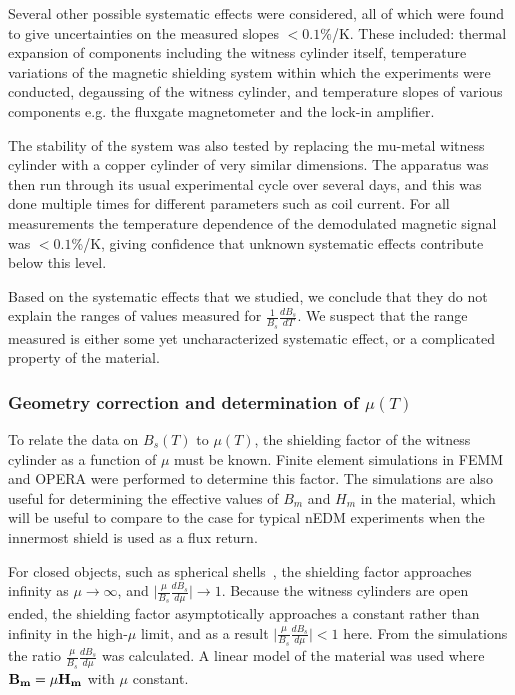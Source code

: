 Several other possible systematic effects were considered, all of
which were found to give uncertainties on the measured slopes
$<0.1\%$/K.  These included: thermal expansion of components including
the witness cylinder itself, temperature variations of the magnetic
shielding system within which the experiments were conducted,
degaussing of the witness cylinder, and temperature slopes of various
components e.g. the fluxgate magnetometer and the lock-in amplifier.

The stability of the system was also tested by replacing the mu-metal
witness cylinder with a copper cylinder of very similar dimensions.
The apparatus was then run through its usual experimental cycle over
several days, and this was done multiple times for different
parameters such as coil current.  For all measurements the temperature
dependence of the demodulated magnetic signal was $<0.1$\%/K, giving
confidence that unknown systematic effects contribute below this
level.

Based on the systematic effects that we studied, we conclude that they
do not explain the ranges of values measured for
$\frac{1}{B_s}\frac{dB_s}{dT}$.  We suspect that the range measured is
either some yet uncharacterized systematic effect, or a complicated
property of the material.


\subsubsection{Geometry correction and determination of $\mu(T)$\label{sec:axialsims}}

To relate the data on $B_s(T)$ to $\mu(T)$, the shielding factor of
the witness cylinder as a function of $\mu$ must be known.  Finite
element simulations in FEMM and OPERA were performed to determine this
factor.  The simulations are also useful for determining the effective
values of $B_m$ and $H_m$ in the material, which will be useful to
compare to the case for typical nEDM experiments when the innermost
shield is used as a flux return.

For closed objects, such as spherical
shells~\cite{bib:bidinostimartin,bib:urankar}, the shielding factor
approaches infinity as $\mu \rightarrow \infty$, and
$\vert\frac{\mu}{B_s}\frac{dB_s}{d\mu}\vert\rightarrow 1$.  Because
the witness cylinders are open ended, the shielding factor
asymptotically approaches a constant rather than infinity in the
high-$\mu$ limit, and as a result
$\vert\frac{\mu}{B_s}\frac{dB_s}{d\mu}\vert<1$ here.  From the
simulations the ratio $\frac{\mu}{B_s}\frac{dB_s}{d\mu}$ was
calculated.  A linear model of the material was used where
$\bold{B_m}=\mu\bold{H_m}$ with $\mu$ constant.


